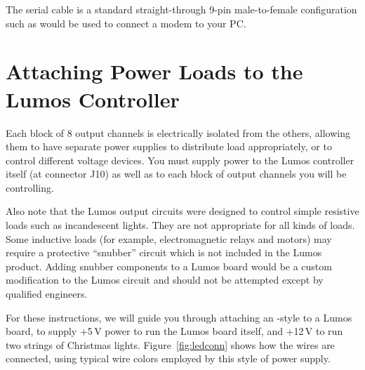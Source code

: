 \documentclass[letterpaper,twoside,onecolumn,openright,final]{memoir}
\begin{document}
The serial cable is a standard straight-through 9-pin male-to-female configuration such as would be used
to connect a modem to your PC.

\section{Attaching Power Loads to the Lumos Controller}
Each block of 8 output channels is electrically isolated from the others, allowing them to have
separate power supplies to distribute load appropriately, or to control different voltage devices.
You must supply power to the Lumos controller itself (at connector J10) as well as to each block of 
output channels you will be controlling.

Also note that the Lumos output circuits were designed to control simple resistive loads such as
incandescent lights.  They are not appropriate for all kinds of loads.  Some inductive loads
(for example, electromagnetic relays and motors) may require a protective ``snubber'' circuit
which is not included in the Lumos product.  Adding snubber components to a Lumos board would be
a custom modification to the Lumos circuit and should not be attempted except by qualified engineers.

For these instructions, we will guide you through attaching an -style  to a 
Lumos board, to supply +5\,V power to run the Lumos board itself, and +12\,V to run two strings of 
Christmas lights.  Figure~\ref{fig:ledconn} shows how the wires are connected, using typical wire colors
employed by this style of power supply.
\end{document}
